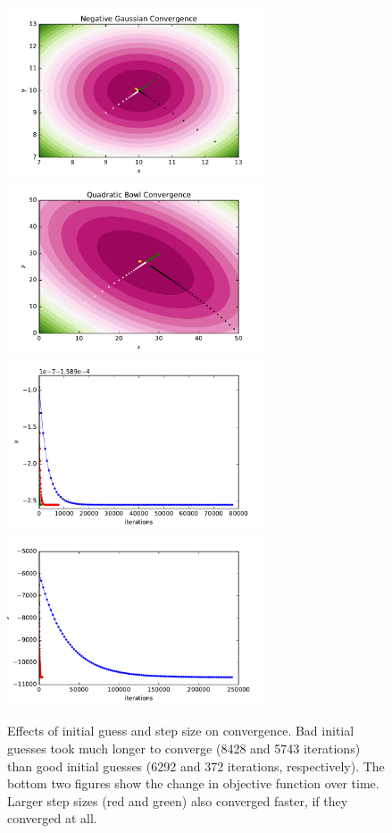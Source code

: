 \documentclass{article}
\begin{document}
\begin{multicols}{2}
\begin{figure}%
   \centering
   \includegraphics[width=3in]{img/1-1-gauss.pdf}  %
   \includegraphics[width=3in]{img/1-1-quad.pdf}  %
   \includegraphics[width=3in]{img/1-1-etaGauss.pdf}  %
   \includegraphics[width=3in]{img/1-1-etaQuad.pdf}  %
   \caption{Effects of initial guess and step size on convergence. Bad initial guesses took much longer to converge (8428 and 5743 iterations) than good initial guesses (6292 and 372 iterations, respectively). The bottom two figures show the change in objective function over time. Larger step sizes (red and green) also converged faster, if they converged at all.}
   \label{fig:1.1}
\end{figure}


\end{multicols}
\end{document}
